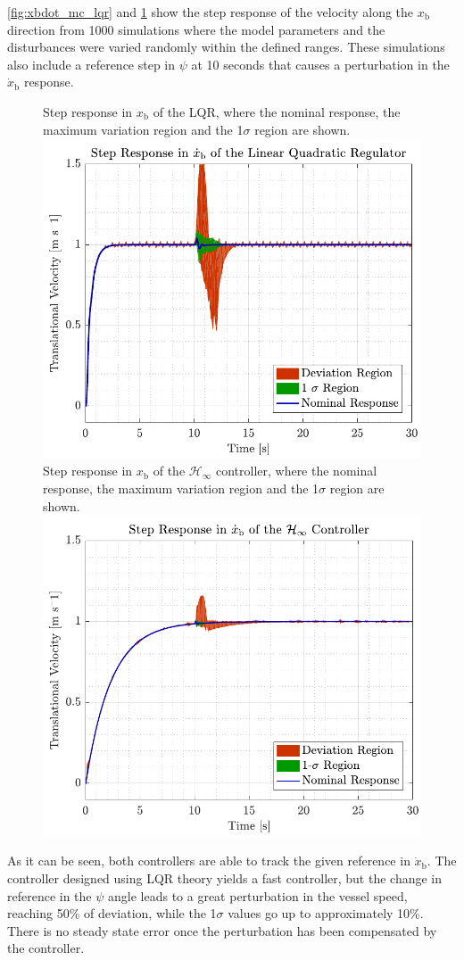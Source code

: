\autoref{fig:xbdot_mc_lqr} and \ref{fig:xbdot_mc_rob} show the step response of the velocity along the $x_\mathrm{b}$ direction from 1000 simulations where the model parameters and the disturbances were varied randomly within the defined ranges. These simulations also include a reference step in $\psi$ at 10 seconds that causes a perturbation in the $\dot{x}_\mathrm{b}$ response. 
\begin{figure}[H]
    \captionbox 
    {   
        Step response in $x_\mathrm{b}$ of the LQR, where the nominal response, the maximum variation region and the 1$\sigma$ region are shown.
        \label{fig:xbdot_mc_lqr}
    }                                                                 
    {                                                                  
        \includegraphics[width=.45\textwidth]{figures/xbdot_mc_lqr}         
    }                                                                    
    \hspace{5pt}                                                          
    \captionbox  
    {      
        Step response in $x_\mathrm{b}$ of the $\mathcal{H}_\infty$ controller, where the nominal response, the maximum variation region and the 1$\sigma$ region are shown.
        \label{fig:xbdot_mc_rob}
    }                                                                          
    {
        \includegraphics[width=.45\textwidth]{figures/xbdot_mc_rob}
    }
\end{figure}
As it can be seen, both controllers are able to track the given reference in $\dot{x}_\mathrm{b}$. The controller designed using LQR theory yields a fast controller, but the change in reference in the $\psi$ angle leads to a great perturbation in the vessel speed, reaching 50\% of deviation, while the 1$\sigma$ values go up to approximately 10\%. There is no steady state error once the perturbation has been compensated by the controller. 

